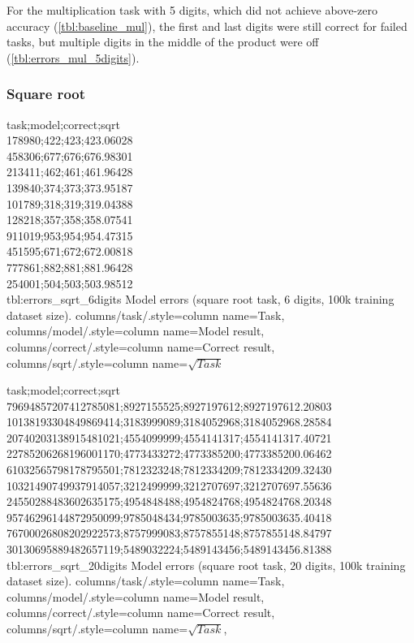For the multiplication task with 5 digits, which did not achieve above-zero accuracy (\cref{tbl:baseline_mul}), the first and last digits were still correct for failed tasks, but multiple digits in the middle of the product were off (\cref{tbl:errors_mul_5digits}).

\subsubsection{Square root}

{
    task;model;correct;sqrt\\
    178980;422;423;423.06028\\
    458306;677;676;676.98301\\
    213411;462;461;461.96428\\
    139840;374;373;373.95187\\
    101789;318;319;319.04388\\
    128218;357;358;358.07541\\
    911019;953;954;954.47315\\
    451595;671;672;672.00818\\
    777861;882;881;881.96428\\
    254001;504;503;503.98512\\
}
{tbl:errors_sqrt_6digits}
{
    Model errors (square root task, 6 digits, 100k training dataset size).
}
{
    columns/task/.style={column name={Task}},
    columns/model/.style={column name={Model result}},
    columns/correct/.style={column name={Correct result}},
    columns/sqrt/.style={column name={$\sqrt{Task}$}}
}

{
    task;model;correct;sqrt\\
    79694857207412785081;8927155525;8927197612;8927197612.20803\\
    10138193304849869414;3183999089;3184052968;3184052968.28584\\
    20740203138915481021;4554099999;4554141317;4554141317.40721\\
    22785206268196001170;4773433272;4773385200;4773385200.06462\\
    61032565798178795501;7812323248;7812334209;7812334209.32430\\
    10321490749937914057;3212499999;3212707697;3212707697.55636\\
    24550288483602635175;4954848488;4954824768;4954824768.20348\\
    95746296144872950099;9785048434;9785003635;9785003635.40418\\
    76700026808202922573;8757999083;8757855148;8757855148.84797\\
    30130695889482657119;5489032224;5489143456;5489143456.81388\\
}
{tbl:errors_sqrt_20digits}
{
    Model errors (square root task, 20 digits, 100k training dataset size).
}
{
    columns/task/.style={column name={Task}},
    columns/model/.style={column name={Model result}},
    columns/correct/.style={column name={Correct result}},
    columns/sqrt/.style={column name={$\sqrt{Task}$}},
}



